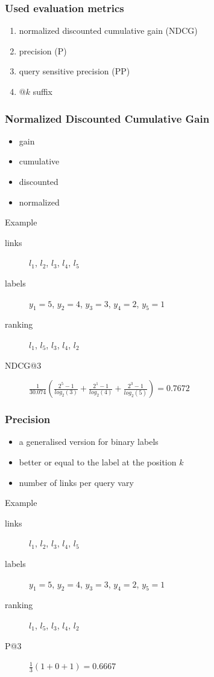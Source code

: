 
\begin{frame}
  \frametitle{Used evaluation metrics}
  \begin{enumerate}
    \item normalized discounted cumulative gain (NDCG)
    \item precision (P)
    \item query sensitive precision (PP)
    \item $@k$ suffix
  \end{enumerate}
\end{frame}

\begin{frame}
  \frametitle{Normalized Discounted Cumulative Gain}
  \begin{itemize}
    \item gain
    \item cumulative
    \item discounted
    \item normalized    
  \end{itemize}
  \begin{exampleblock}{Example}
    \begin{description}
      \item[links] $l_1$, $l_2$, $l_3$, $l_4$, $l_5$
      \item[labels] $y_1=5$, $y_2=4$, $y_3=3$, $y_4=2$, $y_5=1$\\
      \item[ranking] $l_1$, $l_5$, $l_3$, $l_4$, $l_2$
      \item[NDCG@3] $\frac{1}{30.074} (\frac{2^5-1}{log_2(3)} + \frac{2^1-1}{log_2(4)} + \frac{2^3-1}{log_2(5)}) = 0.7672$
    \end{description}
  \end{exampleblock}
\end{frame}

\begin{frame}
  \frametitle{Precision}
  \begin{itemize}
    \item a generalised version for binary labels
    \item better or equal to the label at the position $k$
    \item number of links per query vary
  \end{itemize}
  \begin{exampleblock}{Example}
    
    \begin{description}
      \item[links] $l_1$, $l_2$, $l_3$, $l_4$, $l_5$
      \item[labels] $y_1=5$, $y_2=4$, $y_3=3$, $y_4=2$, $y_5=1$\\
      \item[ranking] $l_1$, $l_5$, $l_3$, $l_4$, $l_2$
      \item[P@3] $\frac{1}{3} (1 + 0 + 1) = 0.6667$
    \end{description}
  \end{exampleblock}
\end{frame}

